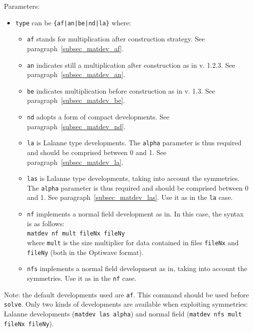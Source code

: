     Parameters:
    \begin{itemize}
    \item\lstinline!type!   can be \lstinline!{af|an|be|nd|la}! where:
    \begin{itemize}
        \item\lstinline!af! stands for multiplication after construction strategy. See paragraph~\ref{subsec_matdev_af}.
        \item\lstinline!an! indicates still a multiplication after construction as in v. 1.2.3. See paragraph~\ref{subsec_matdev_an}.
        \item\lstinline!be! indicates multiplication before construction as in v. 1.3. See paragraph~\ref{subsec_matdev_be}.
        \item\lstinline!nd! adopts a form of compact developments. See paragraph~\ref{subsec_matdev_nd}.
        \item\lstinline!la! is Lalanne type developments\cite{lalanne1997improved}. The \lstinline!alpha! parameter is thus required and should be comprised between 0 and 1. See paragraph~\ref{subsec_matdev_la}.
        \item\lstinline!las! is Lalanne type developments\cite{lalanne1997improved}, taking into account the symmetries. The \lstinline!alpha! parameter is thus required and should be comprised between 0 and 1. See paragraph~\ref{subsec_matdev_las}. Use it as in the \lstinline!la! case.
        \item\lstinline!nf! implements a normal field development as in\cite{schuster2007normal}.
        In this case, the syntax is as follows:\\
        \lstinline!matdev nf mult fileNx fileNy! \\
        where \lstinline!mult! is the size multiplier for data contained in files \lstinline!fileNx! and \lstinline!fileNy! (both in the Optiwave format).
        \item\lstinline!nfs! implements a normal field development as in\cite{schuster2007normal}, taking into account the symmetries. Use it as in the \lstinline!nf! case.
    
    \end{itemize}
    \end{itemize}
    
    Note: the default developments used are \lstinline!af!. This command should be used before \lstinline!solve!. Only two kinds of developments are available when exploiting symmetries: Lalanne developments (\lstinline!matdev las alpha!) and normal field (\lstinline!matdev nfs mult fileNx fileNy!).

